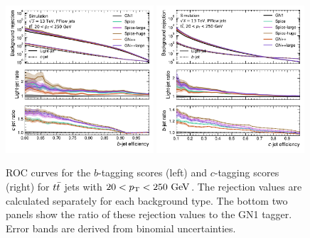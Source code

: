 \begin{figure}[ht]
    \centering
    \includegraphics[width=0.49\textwidth]{figures/flavour_tagging/b_roc_ttbar_large.pdf}
    \includegraphics[width=0.49\textwidth]{figures/flavour_tagging/c_roc_ttbar_large.pdf}
    \caption{ROC curves for the $b$-tagging scores (left) and $c$-tagging scores (right) for $t\bar{t}$ jets with $20 < \pt < 250~\GeV$. The rejection values are calculated separately for each background type. The bottom two panels show the ratio of these rejection values to the GN1 tagger. Error bands are derived from binomial uncertainties.}
    \label{fig:ttbar_roc}
\end{figure}

